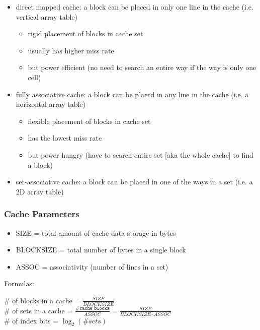 \documentclass[12pt]{extarticle}
\begin{document}
	\begin{itemize}
		\item direct mapped cache: a block can be placed in only one line in the cache (i.e. vertical array table)
		\begin{itemize}
			\item rigid placement of blocks in cache set
			\item usually has higher miss rate
			\item but power efficient (no need to search an entire way if the way is only one cell)
		\end{itemize}
		\item fully associative cache: a block can be placed in any line in the cache (i.e. a horizontal array table)
		\begin{itemize}
			\item flexible placement of blocks in cache set
			\item has the lowest miss rate
			\item but power hungry (have to search entire set [aka the whole cache] to find a block)
		\end{itemize}
		\item set-associative cache: a block can be placed in one of the ways in a set (i.e. a 2D array table)
	\end{itemize}

	\subsubsection{Cache Parameters}

	\begin{itemize}
		\item SIZE = total amount of cache data storage in bytes
		\item BLOCKSIZE = total number of bytes in a single block
		\item ASSOC = associativity (number of lines in a set)
	\end{itemize}

	\noindent Formulas:

	\# of blocks in a cache = $\frac{SIZE}{BLOCKSIZE}$ \\

	\# of sets in a cache = $\frac{\texttt{\# cache blocks}}{ASSOC} = \frac{SIZE}{BLOCKSIZE \cdot ASSOC}$ \\

	\# of index bits = $\log_2(\# sets)$ \\
\end{document}
